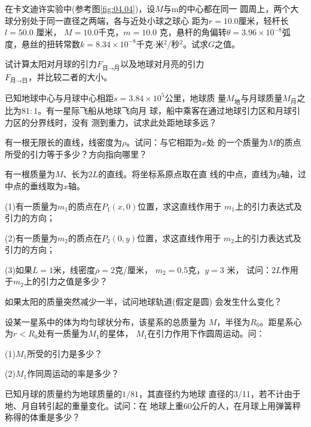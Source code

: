\begin{exercises}

\exercise 在卡文迪许实验中(参考图\ref{fig:04.04})，设$ M $与$ $m的中心都在同一
圆周上，两个大球分别处于同一直径之两端，各与近处小球之球心
距为$ r = 1 0 . 0 $厘米，轻杆长$ l = 5 0 . 0 $ 厘米， $ M = 1 0 . 0 $千克，$ m = 1 0 . 0 $
克，悬杆的角偏转$ \theta = 3 . 9 6 \times 1 0 ^ { - 8 } $弧度，悬丝的扭转常数$ k = 8 . 3 4
  \times 1 0 ^ { - 8 } $千克$ \cdot $米$ ^2 $/秒$ ^2 $。试求$ G $之值。

\exercise 试计算太阳对月球的引力$ F _ {\text{日}\to\text{月}} $以及地球对月亮的引力\\
$ F _ {\text{月}\to\text{日}} $，并比较二者的大小。

\exercise 已知地球中心与月球中心相距$ s = 3 . 8 4 \times 1 0 ^ 5 $公里，地球质
量$ M _ {\text{地}} $与月球质量$ M _ {\text{月}}$之比为$ 81:1 $。有一星际飞船从地球飞向月
球，船中乘客在通过地球引力区和月球引力区的分界线时，没有
测到重力，试求此处距地球多远？

\exercise 有一根无限长的直线，线密度为$ \rho $。试问：与它相距为$ x $处
的一个质量为$ M $的质点所受的引力等于多少？方向指向哪里？

\clearpage
\exercise 有一根质量为$ M $、长为$ 2L $的直线。将坐标系原点取在直
线的中点，直线为$ y $轴，过中点的垂线取为$ x $轴。

(1)有一质量为$ m _ { 1 } $的质点在$ P _ { 1 } \left( x, 0 \right) $位置，求这直线作用于
$ m _ { 1 } $上的引力表达式及引力的方向；

(2)有一质量为$ m _ { 2 } $的质点在$ P _ { 2 } \left( 0, y \right) $位置，求这直线作用于
$ m _ { 2 } $上的引力表达式及引力的方向；

(3)如果$ L = 1 $米，线密度$ \rho = 2 $克/厘米， $ m _ { 2 } = 0 . 5 $克，$ y = 3 $ 米，
试问：$ 2L $作用于$ m _ { 2 } $上的引力之值是多少？

\exercise 如果太阳的质量突然减少一半，试问地球轨道(假定是圆)
会发生什么变化？

\exercise 设某一星系中的体为均匀球状分布，该星系的总质量为
$ M $，半径为$ R _ { 0 } $。距星系心为$ r < R _ { 0 } $处有一质量为$ M _ 1 $的星体，
$ M _ 1 $在引力作用下作圆周运动。问：

(1)$ M _ 1 $所受的引力是多少？

(2)$ M _ 1 $作同周运动的率是多少？

\exercise 已知月球的质量约为地球质量的$ 1/81 $，其直径约为地球
直径的3/11，若不计由于地、月自转引起的重量变化。试问：在
地球上重60公斤的人，在月球上用弹簧秤称得的体重是多少？


\end{exercises}
